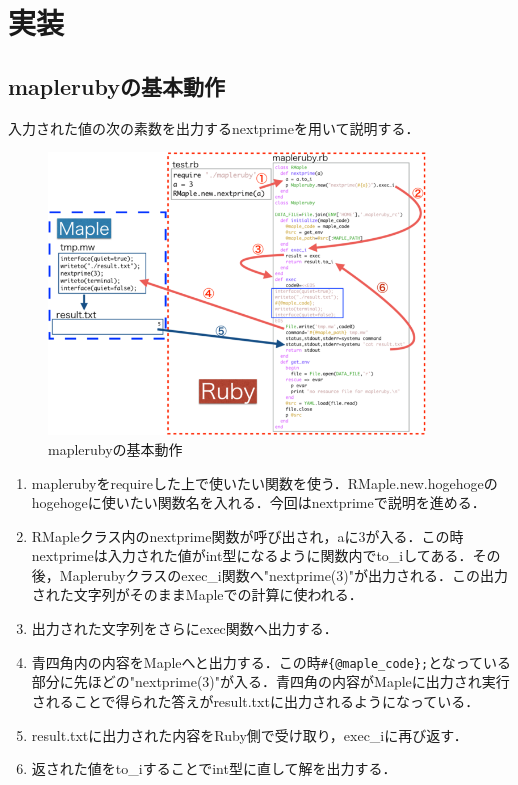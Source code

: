 \section{実装}
\subsection{maplerubyの基本動作}
入力された値の次の素数を出力するnextprimeを用いて説明する．

\begin{figure}[htbp]\begin{center}
\includegraphics[width=10cm,bb= 0 0 737 553]{../figs/./mapleruby_eringi.003.png}
\caption{maplerubyの基本動作}
\label{default}\end{center}\end{figure}
\begin{enumerate}
\item maplerubyをrequireした上で使いたい関数を使う．RMaple.new.hogehogeのhogehogeに使いたい関数名を入れる．今回はnextprimeで説明を進める．
\item RMapleクラス内のnextprime関数が呼び出され，aに3が入る．この時nextprimeは入力された値がint型になるように関数内でto\_iしてある．その後，Maplerubyクラスのexec\_i関数へ"nextprime(3)"が出力される．この出力された文字列がそのままMapleでの計算に使われる．
\item 出力された文字列をさらにexec関数へ出力する．
\item 青四角内の内容をMapleへと出力する．この時\verb|#{@maple_code};|となっている部分に先ほどの"nextprime(3)"が入る．青四角の内容がMapleに出力され実行されることで得られた答えがresult.txtに出力されるようになっている．
\item result.txtに出力された内容をRuby側で受け取り，exec\_iに再び返す．
\item 返された値をto\_iすることでint型に直して解を出力する．
\end{enumerate}
